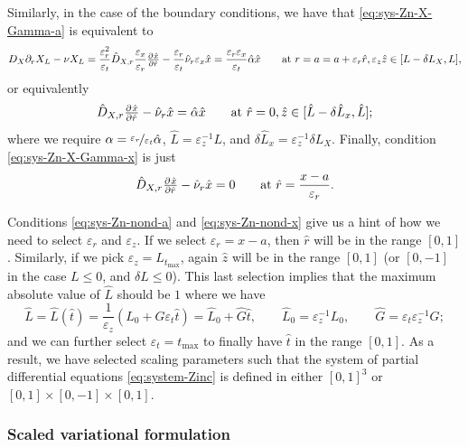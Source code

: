 \documentclass[11pt]{article}
\begin{document}
Similarly, in the case of the boundary conditions, we have that \eqref{eq:sys-Zn-X-Gamma-a} is equivalent to
\[
    D_X \partial_r X_L - \nu X_L = 
    \frac{\varepsilon_r^2}{\varepsilon_t} \hat{D}_{X,r} \frac{\varepsilon_x}{\varepsilon_r} \pd{\hat{x}}{\hat{r}} - \frac{\varepsilon_r}{\varepsilon_t} \hat{\nu}_r \varepsilon_x \hat{x} = \frac{\varepsilon_r \varepsilon_x}{\varepsilon_t} \hat{\alpha} \hat{x}
    \qquad \text{at } r = a = a + \varepsilon_r \hat{r}, \varepsilon_z \hat{z} \in [L - \delta L_X, L],
\]
or equivalently
\begin{equation}
    \label{eq:sys-Zn-nond-a}
    \hat{D}_{X,r} \pd{\hat{x}}{\hat{r}} - \hat{\nu}_r \hat{x} = \hat{\alpha} \hat{x}
    \qquad \text{at } \hat{r} = 0, \hat{z} \in [\hat{L} - \delta \hat{L}_x, \hat{L}];
\end{equation}
where we require \( \alpha = \nicefrac{\varepsilon_r}{\varepsilon_t} \hat{\alpha}\), \( \hat{L} = \varepsilon_z^{-1} L\), and \( \delta\hat{L}_x = \varepsilon_z^{-1} \delta L_X\). Finally, condition \eqref{eq:sys-Zn-X-Gamma-x} is just
\begin{equation}
    \label{eq:sys-Zn-nond-x}
    \hat{D}_{X,r} \pd{\hat{x}}{\hat{r}} - \hat{\nu}_r \hat{x} = 0
    \qquad \text{at } \hat{r} = \frac{x-a}{\varepsilon_r}.
\end{equation}

Conditions \eqref{eq:sys-Zn-nond-a} and \eqref{eq:sys-Zn-nond-x} give us a hint of how we need to select \(\varepsilon_r\) and \(\varepsilon_z\). If we select \( \varepsilon_r = x-a\), then \( \hat{r} \) will be in the range \( [0,1]\). Similarly, if we pick \( \varepsilon_z = L_{t_{\max}}\), again \(\hat z \) will be in the range \( [0,1]\) (or \([0,-1]\) in the case \(L\leq 0\), and \(\delta L \leq 0\)). This last selection implies that the maximum absolute value of \( \hat{L}\) should be \(1\) where we have
\[
    \hat{L} = \hat{L}(\hat t) = \frac{1}{\varepsilon_z} ( L_0 + G \varepsilon_t \hat t )
    = \hat{L}_0 + \hat{G} \hat t,
    \qquad 
    \hat{L}_0 = \varepsilon^{-1}_z L_0,
    \qquad
    \hat{G} = \varepsilon_t \varepsilon_z^{-1} G;
\]
and we can further select \( \varepsilon_t = t_{\max}\) to finally have \( \hat t\) in the range \( [0,1]\). As a result, we have selected scaling parameters such that the system of partial differential equations  \eqref{eq:system-Zinc} is defined in either \( [0,1]^3\) or \([0,1]\times [0,-1] \times [0,1]\).


\subsubsection{Scaled variational formulation}
\end{document}

